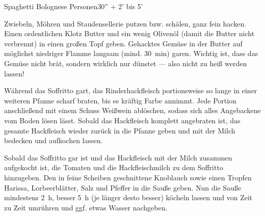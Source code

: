 \begin{MyRecipe}{Spaghetti Bolognese}{ Personen}{30'' + 2' bis 5'}
	
	
	Zwiebeln, Möhren und Staudensellerie putzen bzw. schälen, ganz fein hacken. Einen ordentlichen Klotz Butter und ein wenig Olivenöl (damit die Butter nicht verbrennt) in einen großen Topf geben. Gehacktes Gemüse in der Butter auf möglichst niedriger Flamme langsam (mind. \SI{30}{\minute}) garen. Wichtig ist, dass das Gemüse nicht brät, sondern wirklich nur dünstet --- also nicht zu heiß werden lassen!\par\bigskip
	
	
	Während das Soffritto gart, das Rinderhackfleisch portionsweise so lange in einer weiteren Pfanne scharf braten, bis es kräftig Farbe annimmt. Jede Portion  anschließend mit einem Schuss Weißwein ablöschen, sodass sich alles Angebackene vom Boden lösen lässt. Sobald das Hackfleisch komplett angebraten ist, das gesamte Hackfleisch wieder zurück in die Pfanne geben und mit der Milch bedecken und aufkochen lassen.\par\bigskip

	
	Sobald das Soffritto gar ist und das Hackfleisch mit der Milch zusammen aufgekocht ist, die Tomaten und die Hackfleischmilch zu dem Soffritto hinzugeben. Den in feine Scheiben geschnittene Knoblauch sowie einen Tropfen Harissa, Lorbeerblätter, Salz und Pfeffer in die Sauße geben. Nun die Sauße mindestens \SI{2}{\hour}, besser \SI{5}{\hour} (je länger desto besser) köcheln lassen und von Zeit zu Zeit umrühren und ggf. etwas Wasser nachgeben.
		
	
	
	
\end{MyRecipe}